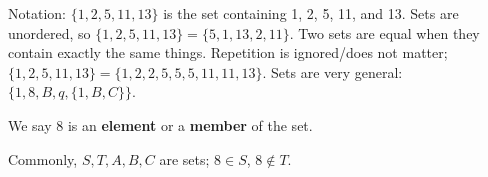 \documentclass{article}
\theoremstyle{definition}
\begin{document}
Notation: $\{1,2,5,11,13\}$ is the set containing 1, 2, 5, 11, and 13. Sets are
unordered, so $\{1,2,5,11,13\}=\{5,1,13,2,11\}$. Two sets are equal when they
contain exactly the same things. Repetition is ignored/does not matter;
$\{1, 2, 5, 11, 13\}=\{1,2,2,5,5,5,11,11,13\}$. Sets are very general:
$\{1,8,B,q,\{1,B,C\}\}$.

We say 8 is an \textbf{element} or a \textbf{member} of the set.

Commonly, $S,T,A,B,C$ are sets; $8 \in S$, $8 \notin T$.
\end{document}
